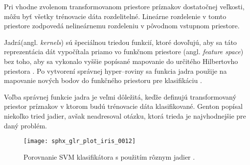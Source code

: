 Pri vhodne zvolenom transformovanom priestore príznakov dostatočnej veľkosti, môžu byť všetky trénovacie dáta rozdelitelné.
Lineárne rozdelenie v tomto priestore zodpovedá nelineárnemu rozdeleniu v pôvodnom vstupnom priestore.

\begin{comment}
Pri mapovaní dát do určitého Hilbertovho priestora \cite{prop:HilbertSpace} $H$ ako $\Phi:R^d \rightarrow H$.
Potom trénovací algoritmus závisí len na údajoch zo skalárneho súčinu (angl. \textit{dot products}) v priestore $H$, t.j na funkciách v tvare $\Phi(x_i) * \Phi(x_j)$.
Ak bude existovať ``funkcia jadra''(angl. \textit{kernel function}) $K$ ako $K(x_i, x_j) = \Phi(x_i)*\Phi(x_j)$, tak budeme musieť použiť iba funkciu $K$ v trénovacom algoritme
    a nikdy nebudeme potrebovať explicitne definovať $\Phi$ \cite{prop:SupervisedMachineLearning}.    
\end{comment}

Jadrá(angl. \textit{kernels}) sú špeciálnou triedou funkcií, ktoré dovoľujú, aby sa táto reprezentácia dát vypočítala priamo vo funkčnom priestore (angl. \textit{feature space}) bez toho,
    aby sa vykonalo vyššie popísané mapovanie do určitého Hilbertovho priestora \cite{prop:HilbertSpace}.
Po vytvorení správnej hyper--roviny sa funkcia jadra použije na mapovanie nových bodov do funkčného priestoru pre klasifikáciu \cite{prop:SupervisedMachineLearning}.

Voľba správnej funkcie jadra je veľmi dôležitá, keďže definujú transformovaný priestor príznakov v ktorom budú trénovacie dáta klasifikované.
Genton \cite{prop:KernelClasses} popísal niekoľko tried jadier, avšak neadresoval otázku, ktorá trieda je najvhodnejšie pre daný problém.

\begin{comment}
    Zoznam populárnych jadier \cite{prop:SupervisedMachineLearning}:
    \begin{equation}
        K(x, y) = (x*y+1)^P
    \end{equation}
    \begin{equation}
        K(x, y) = e^{\frac{-||x-y||^2}{2 \sigma^2}}
    \end{equation}
    \begin{equation}
        K(x, y) = tanh(\kappa x*y - \delta)^P
    \end{equation}
\end{comment}


\begin{figure}[H]
	\centering
	\texttt{[image: sphx\_glr\_plot\_iris\_0012]}
	\caption{Porovnanie SVM klasifikátora s použitím rôznym jadier \cite{odkaz:SVMImage}.}
	\label{pic:SVMComparison}
\end{figure}



